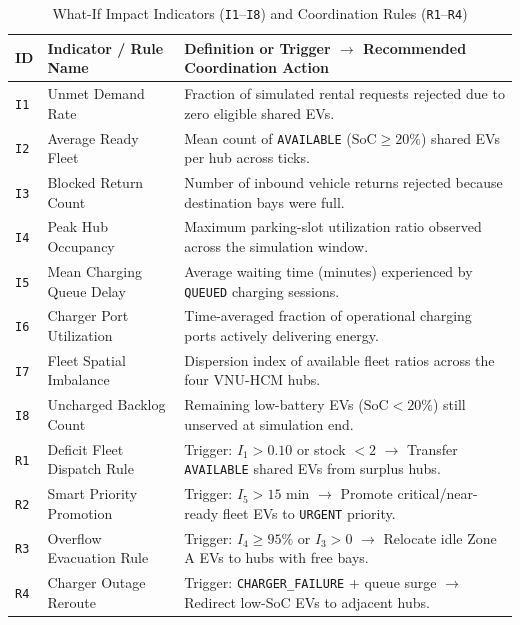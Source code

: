 \begin{table}[H]
  \centering
  \singlespacing\footnotesize
  \caption{What-If Impact Indicators (\texttt{I1}--\texttt{I8}) and Coordination Rules (\texttt{R1}--\texttt{R4})}
  \label{tab:sim-indicators}
  \renewcommand{\arraystretch}{1.18}
  \begin{tabularx}{\textwidth}{|C{1.3cm}|L{4.3cm}|Y|}
    \hline
    \textbf{ID} & \textbf{Indicator / Rule Name} & \textbf{Definition or Trigger $\rightarrow$ Recommended Coordination Action} \\
    \hline
    \texttt{I1} & Unmet Demand Rate & Fraction of simulated rental requests rejected due to zero eligible shared EVs. \\
    \hline
    \texttt{I2} & Average Ready Fleet & Mean count of \texttt{AVAILABLE} ($\text{SoC} \ge 20\%$) shared EVs per hub across ticks. \\
    \hline
    \texttt{I3} & Blocked Return Count & Number of inbound vehicle returns rejected because destination bays were full. \\
    \hline
    \texttt{I4} & Peak Hub Occupancy & Maximum parking-slot utilization ratio observed across the simulation window. \\
    \hline
    \texttt{I5} & Mean Charging Queue Delay & Average waiting time (minutes) experienced by \texttt{QUEUED} charging sessions. \\
    \hline
    \texttt{I6} & Charger Port Utilization & Time-averaged fraction of operational charging ports actively delivering energy. \\
    \hline
    \texttt{I7} & Fleet Spatial Imbalance & Dispersion index of available fleet ratios across the four VNU-HCM hubs. \\
    \hline
    \texttt{I8} & Uncharged Backlog Count & Remaining low-battery EVs ($\text{SoC} < 20\%$) still unserved at simulation end. \\
    \hline
    \texttt{R1} & Deficit Fleet Dispatch Rule & Trigger: $I_1 > 0.10$ or stock $< 2$ $\rightarrow$ Transfer \texttt{AVAILABLE} shared EVs from surplus hubs. \\
    \hline
    \texttt{R2} & Smart Priority Promotion & Trigger: $I_5 > 15\text{ min}$ $\rightarrow$ Promote critical/near-ready fleet EVs to \texttt{URGENT} priority. \\
    \hline
    \texttt{R3} & Overflow Evacuation Rule & Trigger: $I_4 \ge 95\%$ or $I_3 > 0$ $\rightarrow$ Relocate idle Zone A EVs to hubs with free bays. \\
    \hline
    \texttt{R4} & Charger Outage Reroute & Trigger: \texttt{CHARGER\_\allowbreak FAILURE} + queue surge $\rightarrow$ Redirect low-SoC EVs to adjacent hubs. \\
    \hline
  \end{tabularx}
\end{table}

